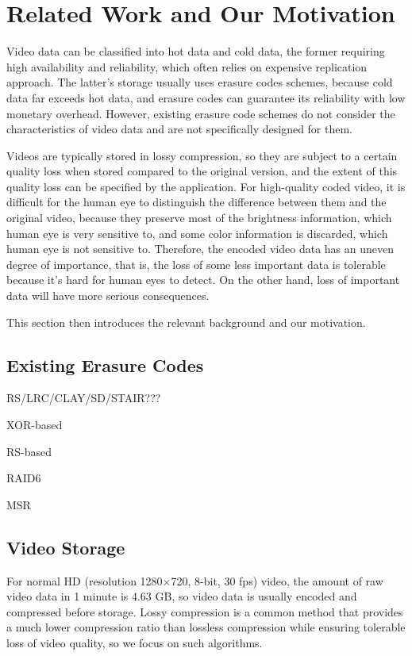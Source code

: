 \documentclass[conference]{IEEEtran}
\begin{document}
\section{Related Work and Our Motivation}
Video data can be classified into hot data and cold data, the former requiring high availability and reliability, which often relies on expensive replication approach. The latter's storage usually uses erasure codes schemes, because cold data far exceeds hot data, and erasure codes can guarantee its reliability with low monetary overhead. However, existing erasure code schemes do not consider the characteristics of video data and are not specifically designed for them.

Videos are typically stored in lossy compression, so they are subject to a certain quality loss when stored compared to the original version, and the extent of this quality loss can be specified by the application. For high-quality coded video, it is difficult for the human eye to distinguish the difference between them and the original video, because they preserve most of the brightness information, which human eye is very sensitive to, and some color information is discarded, which human eye is not sensitive to. Therefore, the encoded video data has an uneven degree of importance, that is, the loss of some less important data is tolerable because it's hard for human eyes to detect. On the other hand, loss of important data will have more serious consequences.

This section then introduces the relevant background and our motivation.

\subsection{Existing Erasure Codes}
RS/LRC/CLAY/SD/STAIR???

XOR-based

RS-based

RAID6

MSR

\subsection{Video Storage}\label{video storage}
For normal HD (resolution 1280$\times$720, 8-bit, 30 fps) video, the amount of raw video data in 1 minute is 4.63 GB, so video data is usually encoded and compressed before storage. Lossy compression is a common method that provides a much lower compression ratio than lossless compression while ensuring tolerable loss of video quality, so we focus on such algorithms.
\end{document}
